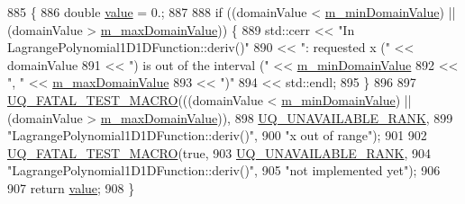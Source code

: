 \begin{DoxyCode}
885 \{
886   \textcolor{keywordtype}{double} \hyperlink{class_q_u_e_s_o_1_1_lagrange_polynomial1_d1_d_function_ada2741739cc9ff0fe98bb51e690df072}{value} = 0.;
887 
888   \textcolor{keywordflow}{if} ((domainValue < \hyperlink{class_q_u_e_s_o_1_1_base1_d1_d_function_a7b18b3854ee74ef5befbc67b75ebbdc5}{m\_minDomainValue}) || (domainValue > 
      \hyperlink{class_q_u_e_s_o_1_1_base1_d1_d_function_aa0025999ccab2145cd46c0a81e260e8f}{m\_maxDomainValue})) \{
889     std::cerr << \textcolor{stringliteral}{"In LagrangePolynomial1D1DFunction::deriv()"}
890               << \textcolor{stringliteral}{": requested x ("}            << domainValue
891               << \textcolor{stringliteral}{") is out of the interval ("} << \hyperlink{class_q_u_e_s_o_1_1_base1_d1_d_function_a7b18b3854ee74ef5befbc67b75ebbdc5}{m\_minDomainValue}
892               << \textcolor{stringliteral}{", "}                         << \hyperlink{class_q_u_e_s_o_1_1_base1_d1_d_function_aa0025999ccab2145cd46c0a81e260e8f}{m\_maxDomainValue}
893               << \textcolor{stringliteral}{")"}
894               << std::endl;
895   \}
896 
897   \hyperlink{_defines_8h_a56d63d18d0a6d45757de47fcc06f574d}{UQ\_FATAL\_TEST\_MACRO}(((domainValue < \hyperlink{class_q_u_e_s_o_1_1_base1_d1_d_function_a7b18b3854ee74ef5befbc67b75ebbdc5}{m\_minDomainValue}) || (domainValue 
      > \hyperlink{class_q_u_e_s_o_1_1_base1_d1_d_function_aa0025999ccab2145cd46c0a81e260e8f}{m\_maxDomainValue})),
898                       \hyperlink{namespace_q_u_e_s_o_a7d4679800a430ae8e473c1c7bc0bfb21}{UQ\_UNAVAILABLE\_RANK},
899                       \textcolor{stringliteral}{"LagrangePolynomial1D1DFunction::deriv()"},
900                       \textcolor{stringliteral}{"x out of range"});
901 
902   \hyperlink{_defines_8h_a56d63d18d0a6d45757de47fcc06f574d}{UQ\_FATAL\_TEST\_MACRO}(\textcolor{keyword}{true},
903                       \hyperlink{namespace_q_u_e_s_o_a7d4679800a430ae8e473c1c7bc0bfb21}{UQ\_UNAVAILABLE\_RANK},
904                       \textcolor{stringliteral}{"LagrangePolynomial1D1DFunction::deriv()"},
905                       \textcolor{stringliteral}{"not implemented yet"});
906 
907   \textcolor{keywordflow}{return} \hyperlink{class_q_u_e_s_o_1_1_lagrange_polynomial1_d1_d_function_ada2741739cc9ff0fe98bb51e690df072}{value};
908 \}
\end{DoxyCode}
